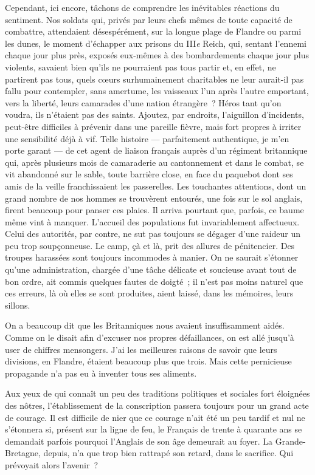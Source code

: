 \documentclass[french,twoside]{book} %
\begin{document}
Cependant, ici encore, tâchons de comprendre les inévitables réactions du sentiment. Nos soldats qui, privés par leurs chefs mêmes de toute capacité de combattre, attendaient désespérément, sur la longue plage de Flandre ou parmi les dunes, le moment d’échapper aux prisons du III\emph{e} Reich, qui, sentant l’ennemi chaque jour plus près, exposés eux-mêmes à des bombardements chaque jour plus violents, savaient bien qu’ils ne pourraient pas tous partir et, en effet, ne partirent pas tous, quels cœurs surhumainement charitables ne leur aurait-il pas fallu pour contempler, sans amertume, les vaisseaux l’un après l’autre emportant, vers la liberté, leurs camarades d’une nation étrangère ? Héros tant qu’on   voudra, ils n’étaient pas des saints. Ajoutez, par endroits, l’aiguillon d’incidents, peut-être difficiles à prévenir dans une pareille fièvre, mais fort propres à irriter une sensibilité déjà à vif. Telle histoire — parfaitement authentique, je m’en porte garant — de cet agent de liaison français auprès d’un régiment britannique qui, après plusieurs mois de camaraderie au cantonnement et dans le combat, se vit abandonné sur le sable, toute barrière close, en face du paquebot dont ses amis de la veille franchissaient les passerelles. Les touchantes attentions, dont un grand nombre de nos hommes se trouvèrent entourés, une fois sur le sol anglais, firent beaucoup pour panser ces plaies. Il arriva pourtant que, parfois, ce baume même vint à manquer. L’accueil des populations fut invariablement affectueux. Celui des autorités, par contre, ne sut pas toujours se dégager d’une raideur un peu trop soupçonneuse. Le camp, çà et là, prit des allures de pénitencier. Des troupes harassées sont toujours incommodes à manier. On ne saurait s’étonner qu’une administration, chargée d’une tâche délicate et soucieuse avant tout de bon ordre, ait commis quelques fautes de doigté ; il n’est pas moins naturel que ces erreurs, là où elles se sont produites, aient laissé, dans les mémoires, leurs sillons.\par
On a beaucoup dit que les Britanniques nous avaient insuffisamment aidés. Comme on le disait afin d’excuser nos propres défaillances, on est allé jusqu’à user de chiffres mensongers. J’ai les meilleures raisons de savoir que leurs divisions, en Flandre, étaient beaucoup plus que trois. Mais cette pernicieuse propagande n’a pas eu à inventer tous ses aliments.\par
Aux yeux de qui connaît un peu des traditions politiques et sociales fort éloignées des nôtres, l’établissement de la conscription passera toujours pour un grand acte de courage. Il est difficile de nier que   ce courage n’ait été un peu tardif et nul ne s’étonnera si, présent sur la ligne de feu, le Français de trente à quarante ans se demandait parfois pourquoi l’Anglais de son âge demeurait au foyer. La Grande-Bretagne, depuis, n’a que trop bien rattrapé son retard, dans le sacrifice. Qui prévoyait alors l’avenir ?\par
\end{document}
